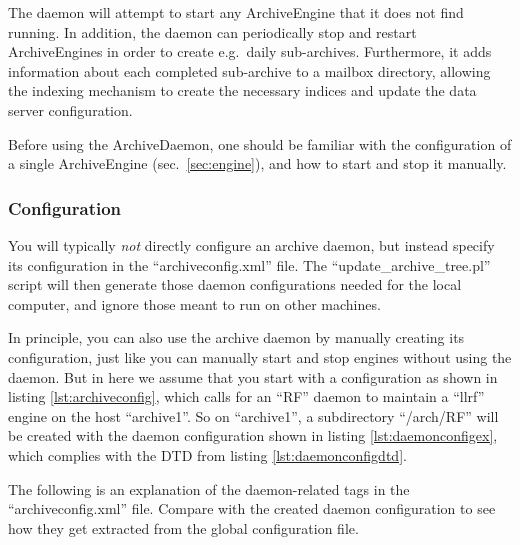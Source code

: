 The daemon will attempt to start any ArchiveEngine
that it does not find running. In addition, the daemon can
periodically stop and restart ArchiveEngines in order to create
e.g.\ daily sub-archives.  Furthermore, it adds information about
each completed sub-archive to a mailbox directory,
allowing the indexing mechanism to create the necessary indices
and update the data server configuration.

Before using the ArchiveDaemon, one should be familiar
with the configuration of a single ArchiveEngine (sec.\ \ref{sec:engine}),
and how to start and stop it manually.



\subsubsection{Configuration}
You will typically \emph{not} directly configure an archive daemon,
but instead specify its configuration in the ``archiveconfig.xml''
file. The ``update\_archive\_tree.pl'' script will then generate
those daemon configurations needed for the local computer, and ignore
those meant to run on other machines.
\clearpage

In principle, you can also use the archive daemon by manually creating
its configuration, just like you can manually start and stop engines
without using the daemon. But in here we assume that you start with a
configuration as shown in listing \ref{lst:archiveconfig},
which calls for an ``RF'' daemon to maintain a ``llrf'' engine on the host
``archive1''. So on ``archive1'', a subdirectory ``/arch/RF'' will be
created with the daemon configuration shown in listing 
\ref{lst:daemonconfigex}, which complies with the DTD from listing
\ref{lst:daemonconfigdtd}.

The following is an explanation of the daemon-related tags in the
``archiveconfig.xml'' file. Compare with the created daemon
configuration to see how they get extracted from the global
configuration file.

